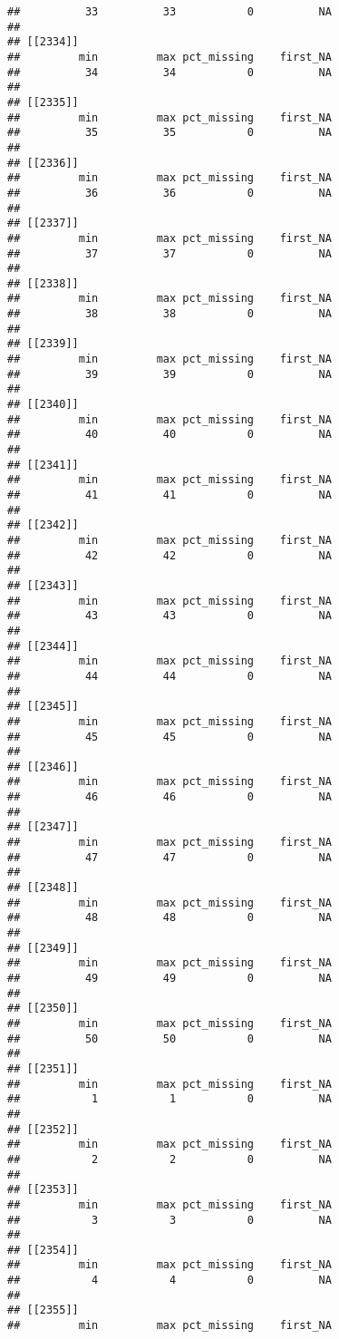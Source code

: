 \documentclass[
]{article}
\begin{document}
\begin{verbatim}
##          33          33           0          NA 
## 
## [[2334]]
##         min         max pct_missing    first_NA 
##          34          34           0          NA 
## 
## [[2335]]
##         min         max pct_missing    first_NA 
##          35          35           0          NA 
## 
## [[2336]]
##         min         max pct_missing    first_NA 
##          36          36           0          NA 
## 
## [[2337]]
##         min         max pct_missing    first_NA 
##          37          37           0          NA 
## 
## [[2338]]
##         min         max pct_missing    first_NA 
##          38          38           0          NA 
## 
## [[2339]]
##         min         max pct_missing    first_NA 
##          39          39           0          NA 
## 
## [[2340]]
##         min         max pct_missing    first_NA 
##          40          40           0          NA 
## 
## [[2341]]
##         min         max pct_missing    first_NA 
##          41          41           0          NA 
## 
## [[2342]]
##         min         max pct_missing    first_NA 
##          42          42           0          NA 
## 
## [[2343]]
##         min         max pct_missing    first_NA 
##          43          43           0          NA 
## 
## [[2344]]
##         min         max pct_missing    first_NA 
##          44          44           0          NA 
## 
## [[2345]]
##         min         max pct_missing    first_NA 
##          45          45           0          NA 
## 
## [[2346]]
##         min         max pct_missing    first_NA 
##          46          46           0          NA 
## 
## [[2347]]
##         min         max pct_missing    first_NA 
##          47          47           0          NA 
## 
## [[2348]]
##         min         max pct_missing    first_NA 
##          48          48           0          NA 
## 
## [[2349]]
##         min         max pct_missing    first_NA 
##          49          49           0          NA 
## 
## [[2350]]
##         min         max pct_missing    first_NA 
##          50          50           0          NA 
## 
## [[2351]]
##         min         max pct_missing    first_NA 
##           1           1           0          NA 
## 
## [[2352]]
##         min         max pct_missing    first_NA 
##           2           2           0          NA 
## 
## [[2353]]
##         min         max pct_missing    first_NA 
##           3           3           0          NA 
## 
## [[2354]]
##         min         max pct_missing    first_NA 
##           4           4           0          NA 
## 
## [[2355]]
##         min         max pct_missing    first_NA 

\end{verbatim}
\end{document}
